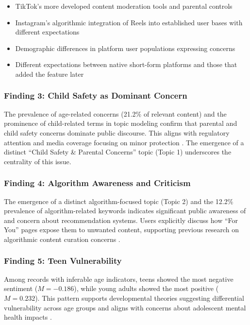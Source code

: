 \documentclass[11pt,a4paper]{article}
\begin{document}
\begin{itemize}[leftmargin=*, itemsep=0.3em]
    \item TikTok's more developed content moderation tools and parental controls \citep{tiktok2023safety}
    \item Instagram's algorithmic integration of Reels into established user bases with different expectations
    \item Demographic differences in platform user populations expressing concerns
    \item Different expectations between native short-form platforms and those that added the feature later
\end{itemize}

\subsubsection{Finding 3: Child Safety as Dominant Concern}

The prevalence of age-related concerns (21.2\% of relevant content) and the prominence of child-related terms in topic modeling confirm that parental and child safety concerns dominate public discourse. This aligns with regulatory attention and media coverage focusing on minor protection \citep{ofcom2023children}. The emergence of a distinct ``Child Safety \& Parental Concerns'' topic (Topic 1) underscores the centrality of this issue.

\subsubsection{Finding 4: Algorithm Awareness and Criticism}

The emergence of a distinct algorithm-focused topic (Topic 2) and the 12.2\% prevalence of algorithm-related keywords indicates significant public awareness of and concern about recommendation systems. Users explicitly discuss how ``For You'' pages expose them to unwanted content, supporting previous research on algorithmic content curation concerns \citep{pariser2011filter, ribeiro2020auditing}.

\subsubsection{Finding 5: Teen Vulnerability}

Among records with inferable age indicators, teens showed the most negative sentiment ($M = -0.186$), while young adults showed the most positive ($M = 0.232$). This pattern supports developmental theories suggesting differential vulnerability across age groups and aligns with concerns about adolescent mental health impacts \citep{twenge2018increases}.
\end{document}
